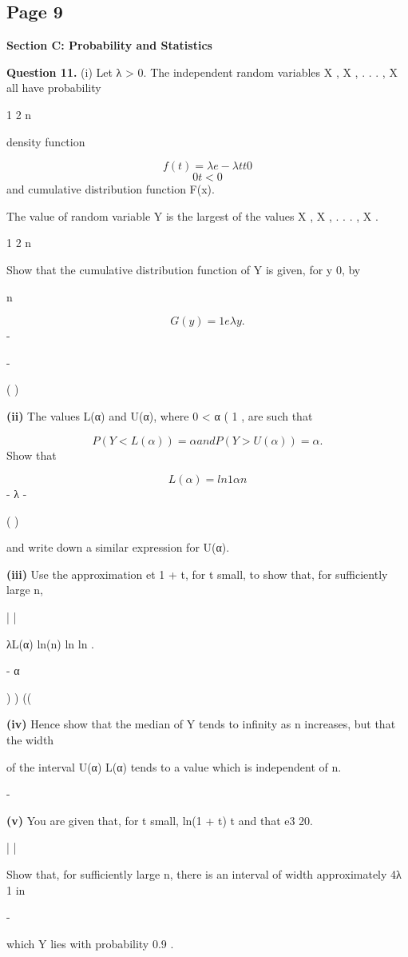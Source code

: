 \documentclass[12pt]{article}
\begin{document}
\subsection*{Page 9}
\begin{flushleft}
\bigskip\textbf{Section C: Probability and Statistics}\par
\bigskip\textbf{Question 11.} (i) Let λ > 0. The independent random variables X , X , . . . , X all have probability\par
1 2 n\par
density function\par
\[f(t) = λe - λt t  0\]
\[0 t < 0\]
and cumulative distribution function F(x).\par
The value of random variable Y is the largest of the values X , X , . . . , X .\par
1 2 n\par
Show that the cumulative distribution function of Y is given, for y  0, by\par
n\par
\[G(y) = 1 e λy .\]
-\par
-\par
( )\par
\textbf{(ii)} The values L(α) and U(α), where 0 < α ( 1 , are such that\par
\[P(Y < L(α)) = α and P(Y > U(α)) = α.\]
Show that\par
\[L(α) = ln 1 α n\]
- λ -\par
( )\par
and write down a similar expression for U(α).\par
\textbf{(iii)} Use the approximation et 1 + t, for t small, to show that, for sufficiently large n,\par
\approx | |\par
λL(α) ln(n) ln ln .\par
\approx - α\par
) ) ((\par
\textbf{(iv)} Hence show that the median of Y tends to infinity as n increases, but that the width\par
of the interval U(α) L(α) tends to a value which is independent of n.\par
-\par
\textbf{(v)} You are given that, for t small, ln(1 + t) t and that e3 20.\par
| | \approx \approx\par
Show that, for sufficiently large n, there is an interval of width approximately 4λ 1 in\par
-\par
which Y lies with probability 0.9 .\par
\end{flushleft}
\end{document}
